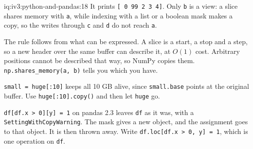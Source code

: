 \begin{solution}{iq:iv3:python-and-pandas:18}
It prints \texttt{[ 0 99  2  3  4]}. Only \texttt{b} is a view: a slice shares memory with \texttt{a}, while indexing with a list or a boolean mask makes a copy, so the writes through \texttt{c} and \texttt{d} do not reach \texttt{a}.

The rule follows from what can be expressed. A slice is a start, a stop and a step, so a new header over the same buffer can describe it, at $O(1)$ cost. Arbitrary positions cannot be described that way, so NumPy copies them. \texttt{np.shares\_memory(a, b)} tells you which you have.

\texttt{small = huge[:10]} keeps all 10 GB alive, since \texttt{small.base} points at the original buffer. Use \texttt{huge[:10].copy()} and then let \texttt{huge} go.

\texttt{df[df.x > 0][\textquotesingle y\textquotesingle] = 1} on pandas 2.3 leaves \texttt{df} as it was, with a \texttt{SettingWithCopyWarning}. The mask gives a new object, and the assignment goes to that object. It is then thrown away. Write \texttt{df.loc[df.x > 0, \textquotesingle y\textquotesingle] = 1}, which is one operation on \texttt{df}.

\end{solution}

